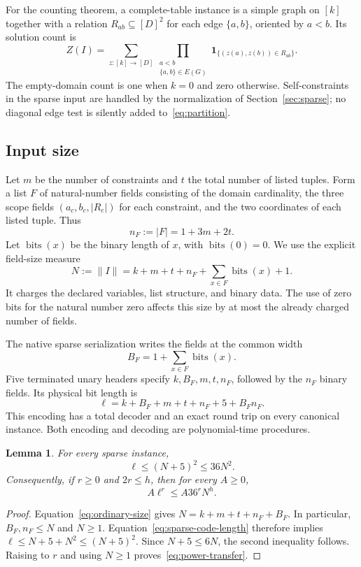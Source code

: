 \documentclass[11pt,reqno]{amsart}
\numberwithin{equation}{section}
\newtheorem{lemma}[theorem]{Lemma}
\theoremstyle{definition}
\theoremstyle{remark}
\newcommand{\bits}{\operatorname{bits}}
\newcommand{\ind}[1]{\mathbf 1_{\{#1\}}}
\begin{document}
For the counting theorem, a complete-table instance is a simple graph on $[k]$ together with a relation $R_{ab}\subseteq[D]^2$ for each edge $\{a,b\}$, oriented by $a<b$. Its solution count is
\begin{equation}\label{eq:partition}
 Z(I)=\sum_{z:[k]\to[D]}
 \prod_{\substack{a<b\\\{a,b\}\in E(G)}}
 \ind{(z(a),z(b))\in R_{ab}}.
\end{equation}
The empty-domain count is one when $k=0$ and zero otherwise. Self-constraints in the sparse input are handled by the normalization of Section~\ref{sec:sparse}; no diagonal edge test is silently added to~\eqref{eq:partition}.

\subsection{Input size}

Let $m$ be the number of constraints and $t$ the total number of listed tuples. Form a list $F$ of natural-number fields consisting of the domain cardinality, the three scope fields $(a_c,b_c,|R_c|)$ for each constraint, and the two coordinates of each listed tuple. Thus
\[
 n_F:=|F|=1+3m+2t.
\]
Let $\bits(x)$ be the binary length of $x$, with $\bits(0)=0$. We use the explicit field-size measure
\begin{equation}\label{eq:ordinary-size}
 N:=\lVert I\rVert
   =k+m+t+n_F+\sum_{x\in F}\bits(x)+1.
\end{equation}
It charges the declared variables, list structure, and binary data. The use of zero bits for the natural number zero affects this size by at most the already charged number of fields.

The native sparse serialization writes the fields at the common width
\[
 B_F=1+\sum_{x\in F}\bits(x).
\]
Five terminated unary headers specify $k,B_F,m,t,n_F$, followed by the $n_F$ binary fields. Its physical bit length is
\begin{equation}\label{eq:sparse-code-length}
 \ell=k+B_F+m+t+n_F+5+B_Fn_F.
\end{equation}
This encoding has a total decoder and an exact round trip on every canonical instance. Both encoding and decoding are polynomial-time procedures.

\begin{lemma}\label{lem:encoding}
For every sparse instance,
\begin{equation}\label{eq:encoding-bound}
 \ell\le(N+5)^2\le36N^2.
\end{equation}
Consequently, if $r\ge0$ and $2r\le h$, then for every $A\ge0$,
\begin{equation}\label{eq:power-transfer}
 A\ell^r\le A36^r N^h.
\end{equation}
\end{lemma}
\begin{proof}
Equation~\eqref{eq:ordinary-size} gives $N=k+m+t+n_F+B_F$. In particular, $B_F,n_F\le N$ and $N\ge1$. Equation~\eqref{eq:sparse-code-length} therefore implies $\ell\le N+5+N^2\le(N+5)^2$. Since $N+5\le6N$, the second inequality follows. Raising to $r$ and using $N\ge1$ proves~\eqref{eq:power-transfer}.
\end{proof}
\end{document}
